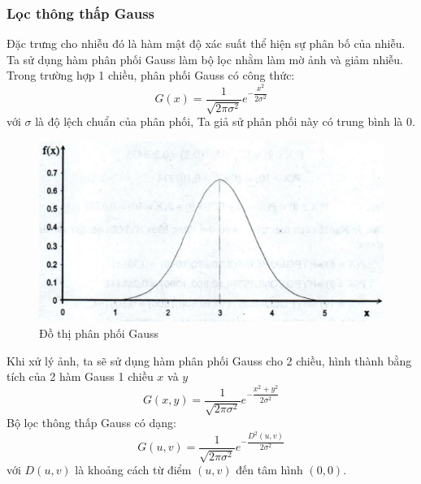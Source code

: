 \documentclass[12pt,a4paper]{report}
\numberwithin{equation}{section}
\theoremstyle{definition} %
\begin{document}
\subsubsection{Lọc thông thấp Gauss}

Đặc trưng cho nhiễu đó là hàm mật độ xác suất thể hiện sự phân bố của nhiễu. Ta sử dụng hàm phân phối Gauss làm bộ lọc nhằm làm mờ ảnh và giảm nhiễu. Trong trường hợp 1 chiều, phân phối Gauss có công thức:
\begin{equation}
G(x) = \dfrac{1}{\sqrt{2\pi \sigma^2}}e^{-\dfrac{x^2}{2\sigma^2}}
\end{equation}
với $\sigma$ là độ lệch chuẩn của phân phối, Ta giả sử phân phối này có trung bình là 0.
\begin{figure}[H]
\centering
\includegraphics[width=0.8\linewidth]{img/phanphoigauss.png}
\caption{Đồ thị phân phối Gauss}
\label{fig115}
\end{figure}
Khi xử lý ảnh, ta sẽ sử dụng hàm phân phối Gauss cho 2 chiều, hình thành bằng tích của 2 hàm Gauss 1 chiều $x$ và $y$ 
\begin{equation}
G(x,y) =  \dfrac{1}{\sqrt{2\pi \sigma^2}}e^{-\dfrac{x^2+y^2}{2\sigma^2}}
\end{equation}
Bộ lọc thông thấp Gauss có dạng:
\begin{equation}
G(u,v) =  \dfrac{1}{\sqrt{2\pi \sigma^2}}e^{-\dfrac{D^2(u,v)}{2\sigma^2}}
\end{equation}
với $D(u,v)$ là khoảng cách từ điểm $(u,v)$ đến tâm hình $(0,0)$.
\end{document}
